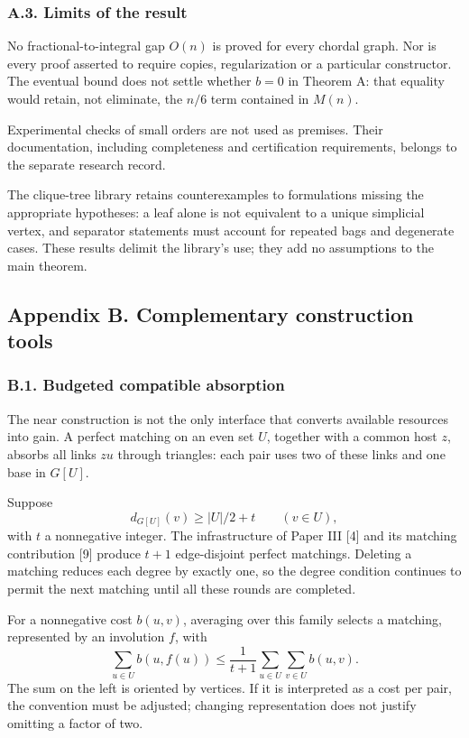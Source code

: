 \documentclass[english,11pt,a4paper]{article}
\begin{document}
\subsubsection{A.3. Limits of the result}\label{a.3.-limits-of-the-result}

No fractional-to-integral gap \(O(n)\) is proved for every chordal graph. Nor is every proof asserted to require copies, regularization or a particular constructor. The eventual bound does not settle whether \(b=0\) in Theorem A: that equality would retain, not eliminate, the \(n/6\) term contained in \(M(n)\).

Experimental checks of small orders are not used as premises. Their documentation, including completeness and certification requirements, belongs to the separate research record.

The clique-tree library retains counterexamples to formulations missing the appropriate hypotheses: a leaf alone is not equivalent to a unique simplicial vertex, and separator statements must account for repeated bags and degenerate cases. These results delimit the library's use; they add no assumptions to the main theorem.

\subsection{Appendix B. Complementary construction tools}\label{appendix-b.-complementary-construction-tools}

\subsubsection{B.1. Budgeted compatible absorption}\label{b.1.-budgeted-compatible-absorption}

The near construction is not the only interface that converts available resources into gain. A perfect matching on an even set \(U\), together with a common host \(z\), absorbs all links \(zu\) through triangles: each pair uses two of these links and one base in \(G[U]\).

Suppose \[
d_{G[U]}(v)\ge |U|/2+t\qquad(v\in U),
\tag{B.1}
\] with \(t\) a nonnegative integer. The infrastructure of Paper III {[}4{]} and its matching contribution {[}9{]} produce \(t+1\) edge-disjoint perfect matchings. Deleting a matching reduces each degree by exactly one, so the degree condition continues to permit the next matching until all these rounds are completed.

For a nonnegative cost \(b(u,v)\), averaging over this family selects a matching, represented by an involution \(f\), with \[
\sum_{u\in U}b(u,f(u))
\le\frac1{t+1}\sum_{u\in U}\sum_{v\in U}b(u,v).
\tag{B.2}
\] The sum on the left is oriented by vertices. If it is interpreted as a cost per pair, the convention must be adjusted; changing representation does not justify omitting a factor of two.
\end{document}
